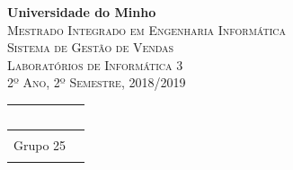 \documentclass[a4paper]{report} %
\begin{document}
\begin{titlepage}

\begin{center}
    {\huge {\bf Universidade do Minho}}\\[0.4cm]
    \vspace{0.5cm}
    \textsc{\huge{Mestrado Integrado em Engenharia Informática}}\\[1.0cm]
    \vspace{2.0cm}
    \textsc{\huge{Sistema de Gestão de Vendas}}\\[0.5cm]
    \vspace{0.5cm}
    \textsc{Laboratórios de Informática 3}\\[0.5cm]
    \textsc{2º Ano, 2º Semestre, 2018/2019}\\[0.5cm]
    \vspace{0.5cm}
    

\begin{table}[h]
\centering
\begin{tabular}{lr}\

\\ \hline
\\
\Large{Grupo 25}\\

 \\ \hline

\end{tabular}
\end{table}




\end{center}
\end{titlepage}
\end{document}
